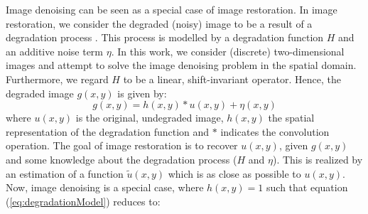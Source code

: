 \documentclass{paper}
\begin{document}
Image denoising can be seen as a special case of image restoration. In image restoration, we consider the degraded (noisy) image to be a result of a degradation process \cite{cattin13}. This process is modelled by a degradation function \begin{math}H\end{math} and an additive noise term \begin{math}\eta\end{math}. In this work, we consider (discrete) two-dimensional images and attempt to solve the image denoising problem in the spatial domain. Furthermore, we regard \begin{math}H\end{math} to be a linear, shift-invariant operator. Hence, the degraded image \begin{math}g(x,y)\end{math} is given by:
\begin{equation}
g(x,y) = h(x,y)\ast u(x,y) + \eta(x,y)
\label{eq:degradationModel}
\end{equation}
where \begin{math}u(x,y)\end{math} is the original, undegraded image, \begin{math}h(x,y)\end{math} the spatial representation of the degradation function and \begin{math}\ast\end{math} indicates the convolution operation. The goal of image restoration is to recover \begin{math}u(x,y)\end{math}, given \begin{math}g(x,y)\end{math} and some knowledge about the degradation process (\begin{math}H\end{math} and \begin{math}\eta\end{math}). This is realized by an estimation of a function \begin{math}\tilde{u}(x,y)\end{math} which is as close as possible to \begin{math}u(x,y)\end{math}. Now, image denoising is a special case, where \begin{math}h(x,y)=1\end{math} such that equation (\ref{eq:degradationModel}) reduces to:
\end{document}
